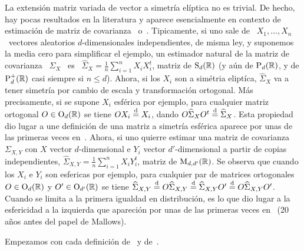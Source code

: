 
\label{Ssec:MP:FamiliaElipticaMatriz}

La  extensi\'on  matriz  variada  de   vector  a  simetr\'ia  el\'iptica  no  es
trivial. De hecho, hay pocas resultados en la literatura y aparece esencialmente
en  contexto de estimaci\'on  de matriz  de covarianza~\cite[\S.~13.2]{BilBre99}
o~\cite{Mal61,  Dem69, Tyl82, GruRoc90,  GupVar94, GupVar95,  GupNag99, FanLi99,
  And03, CarGon16}.  Tipicamente, si uno sale de \ $X_1, \ldots, X_n$ \ vectores
aleatorios $d$-dimensionales independientes, de  misma ley, y suponemos la media
cero  para  simplificar  el  ejemplo,  un  estimador natural  de  la  matriz  de
covarianza \  $\Sigma_X$ \ es \ $\displaystyle  \widehat{\Sigma}_X = \frac{1}{n}
\sum_{i=1}^n X_i X_i^t$, matriz  de $\mathrm{S}_d(\mathbb{R})$ (y a\'un de $\mathrm{P}_d(\mathbb{R})$,
y de $\mathrm{P}_d^+(\mathbb{R})$  casi siempre si $n  \le d$).  Ahora, si los  $X_i$ son a
sim\'etria elipt\'ica, $\widehat{\Sigma}_X$ va  a tener simetr\'ia por cambio de
escala  y transformaci\'on ortogonal.   M\'as precisamente,  si se  supone $X_i$
esf\'erica por ejemplo, para cualquier matriz ortogonal $O \in \mathrm{O}_d(\mathbb{R})$ se
tiene   $O   X_i  \stackrel{\mathrm{d}}{=}   X_i$,   dando   $O   \widehat{\Sigma}_X  O^t   \stackrel{\mathrm{d}}{=}
\widehat{\Sigma}_X$.  Esta propiedad dio lugar  a une definici\'on de una matriz
a simetr\'ia esf\'erica aparece por  unas de las primeras veces en~\cite{Mal61}.
Ahora, si  uno quierre estimar una  matriz de covarianza  $\Sigma_{X,Y}$ con $X$
vector  $d$-dimensional  e $Y_i$  vector  $d'$-dimensional  a  partir de  copias
independientes, $\displaystyle \widehat{\Sigma}_{X,Y} = \frac{1}{n} \sum_{i=1}^n
X_i Y_i^t$,  matriz de $\mathrm{M}_{d,d'}(\mathbb{R})$. Se  observa que cuando  los $X_i$ e
$Y_i$ son esfericas  por ejemplo, para cualquier par  de matrices ortogonales $O
\in \mathrm{O}_d(\mathbb{R})$ y $O'  \in \mathrm{O}_{d'}(\mathbb{R})$ se tiene $\widehat{\Sigma}_{X,Y}
\stackrel{\mathrm{d}}{=}  O  \widehat{\Sigma}_{X,Y}  \stackrel{\mathrm{d}}{=}  \widehat{\Sigma}_{X,Y}  O'  \stackrel{\mathrm{d}}{=}  O
\widehat{\Sigma}_{X,Y}  O'$.   Cuando  se   limita  a  la  primera  igualdad  en
distribuci\'on,  es  lo que  dio  lugar  a la  esfericidad  a  la izquierda  que
apareci\'on por unas de las  primeras veces en~\cite{Hsu40} (20 a\~nos antes del
papel de Mallows).

Empezamos  con cada  definici\'on  de~\cite[\S~9.3]{GupNag99} y  de~\cite{Hsu40,
  Mal61, Dem69,  Daw77, Chm80,  FraNg80,Kar81:1, Kar81, Kar89,  JenGoo81, Tyl82,
  Daw78, Daw81, FanChe84, And03}.

